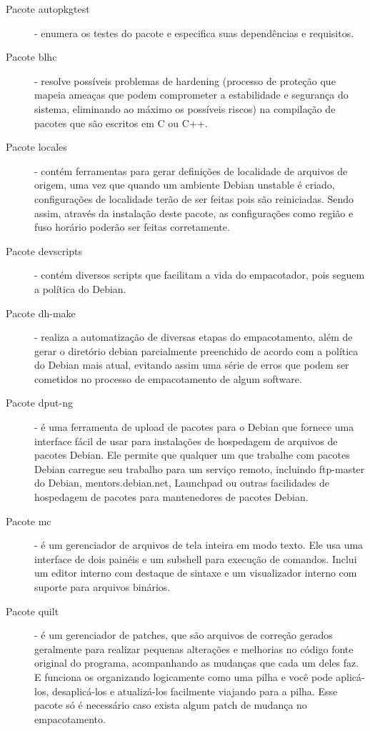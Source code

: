 \begin{description}
	\item[Pacote autopkgtest] - enumera os testes do pacote e especifica suas dependências e requisitos.
	\item[Pacote blhc] - resolve possíveis problemas de hardening (processo de proteção que mapeia ameaças que podem comprometer a estabilidade e segurança do sistema, eliminando ao máximo os possíveis riscos) na compilação de pacotes que são escritos em C ou C++.
	\item[Pacote locales] - contém ferramentas para gerar definições de localidade de arquivos de origem, uma vez que quando um ambiente Debian unstable é criado, configurações de localidade terão de ser feitas pois são reiniciadas. Sendo assim, através da instalação deste pacote, as configurações como região e fuso horário poderão ser feitas corretamente.
	\item[Pacote devscripts] - contém diversos scripts que facilitam a vida do empacotador, pois seguem a política do Debian.
	\item[Pacote dh-make] - realiza a automatização de diversas etapas do empacotamento, além de gerar o diretório debian parcialmente preenchido de acordo com a política do Debian mais atual, evitando assim uma série de erros que podem ser cometidos no processo de empacotamento de algum software.
	\item[Pacote dput-ng] - é uma ferramenta de upload de pacotes para o Debian que fornece uma interface fácil de usar para instalações de hospedagem de arquivos de pacotes Debian. Ele permite que qualquer um que trabalhe com pacotes Debian carregue seu trabalho para um serviço remoto, incluindo ftp-master do Debian, mentors.debian.net, Launchpad ou outras facilidades de hospedagem de pacotes para mantenedores de pacotes Debian.
	\item[Pacote mc] - é um gerenciador de arquivos de tela inteira em modo texto. Ele usa uma interface de dois painéis e um subshell para execução de comandos. Inclui um editor interno com destaque de sintaxe e um visualizador interno com suporte para arquivos binários.
	\item[Pacote quilt] - é um gerenciador de patches, que são arquivos de correção gerados geralmente para realizar pequenas alterações e melhorias no código fonte original do programa, acompanhando as mudanças que cada um deles faz. E funciona os organizando logicamente como uma pilha e você pode aplicá-los, desaplicá-los e atualizá-los facilmente viajando para a pilha. Esse pacote só é necessário caso exista algum patch de mudança no empacotamento.

\end{description}
